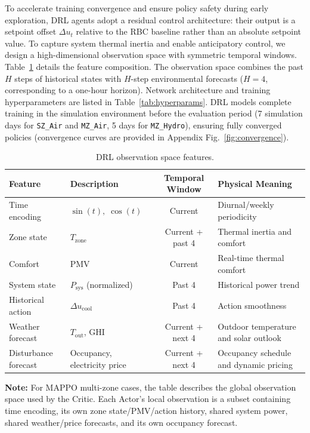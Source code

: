 \documentclass[a4paper]{cas-sc}
\begin{document}
To accelerate training convergence and ensure policy safety during early exploration, DRL agents adopt a residual control architecture: their output is a setpoint offset $\Delta u_t$ relative to the RBC baseline rather than an absolute setpoint value. To capture system thermal inertia and enable anticipatory control, we design a high-dimensional observation space with symmetric temporal windows. Table~\ref{tab:obs} details the feature composition. The observation space combines the past $H$ steps of historical states with $H$-step environmental forecasts ($H = 4$, corresponding to a one-hour horizon). Network architecture and training hyperparameters are listed in Table~\ref{tab:hyperparams}. DRL models complete training in the simulation environment before the evaluation period (7 simulation days for \texttt{SZ\_Air} and \texttt{MZ\_Air}, 5 days for \texttt{MZ\_Hydro}), ensuring fully converged policies (convergence curves are provided in Appendix Fig.~\ref{fig:convergence}).

\begin{table}[htbp]
    \centering
    \caption{DRL observation space features.}
    \label{tab:obs}
    \renewcommand{\arraystretch}{1.3}
    \begin{tabularx}{\textwidth}{l X c l}
        \toprule
        \textbf{Feature} & \textbf{Description} & \textbf{Temporal Window} & \textbf{Physical Meaning} \\
        \midrule
        Time encoding    & $\sin(t),\;\cos(t)$           & Current           & Diurnal/weekly periodicity \\
        Zone state       & $T_{\text{zone}}$             & Current + past 4  & Thermal inertia and comfort \\
        Comfort          & PMV                            & Current           & Real-time thermal comfort \\
        System state     & $P_{\text{sys}}$ (normalized)  & Past 4            & Historical power trend \\
        Historical action & $\Delta u_{\text{cool}}$      & Past 4            & Action smoothness \\
        Weather forecast & $T_{\text{out}}$, GHI          & Current + next 4  & Outdoor temperature and solar outlook \\
        Disturbance forecast & Occupancy, electricity price & Current + next 4 & Occupancy schedule and dynamic pricing \\
        \bottomrule
    \end{tabularx}
    \begin{flushleft}
        \footnotesize
        \textbf{Note:} For MAPPO multi-zone cases, the table describes the global observation space used by the Critic. Each Actor's local observation is a subset containing time encoding, its own zone state/PMV/action history, shared system power, shared weather/price forecasts, and its own occupancy forecast.
    \end{flushleft}
\end{table}
\end{document}
